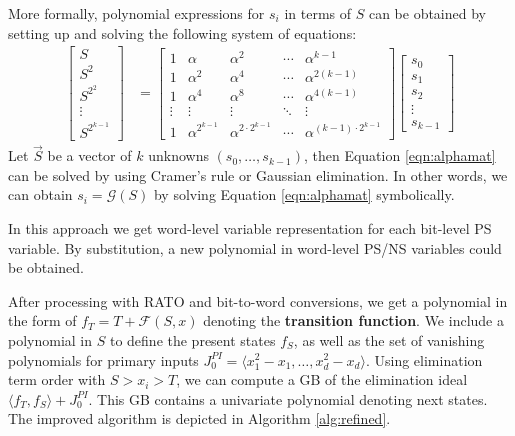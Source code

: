 More formally, polynomial expressions for $s_i$ in terms of $S$ can be
obtained by setting up and solving the following system of equations:
\begin{align}
\label{eqn:alphamat}
\begin{bmatrix}
S \\
S^2 \\
S^{2^2} \\
\vdots \\
S^{2^{k-1}}
\end{bmatrix}
&=
\begin{bmatrix}
1 & \alpha & \alpha^{2} & \cdots & \alpha^{{k-1}}\\
1 & \alpha^{2} & \alpha^{4} & \cdots & \alpha^{2(k-1)} \\
1 & \alpha^{4} & \alpha^{8} & \cdots & \alpha^{4(k-1)}\\
\vdots & \vdots & \vdots & \ddots & \vdots \\
1 & \alpha^{2^{k-1}} & \alpha^{2\cdot 2^{k-1}} & \cdots & \alpha^{(k-1)\cdot 2^{k-1}}
\end{bmatrix}
\begin{bmatrix}
s_0\\
s_1\\
s_2\\
\vdots\\
s_{k-1}
\end{bmatrix}
\end{align}
Let $\vec{S}$ be a vector of $k$ unknowns $(s_0,\dots,s_{k-1})$,
then Equation \ref{eqn:alphamat} can be solved by using Cramer's rule or Gaussian elimination.
In other words, we can obtain $s_i=\mathcal G(S)$ by solving Equation \ref{eqn:alphamat} symbolically.

In this approach we get word-level variable representation for each bit-level PS variable. 
By substitution, a new polynomial in word-level PS/NS variables could be obtained.

After processing with RATO and bit-to-word conversions, we get a polynomial in the 
form of $f_T = T+\mathcal{F}(S,x)$
denoting the {\bf transition function}. We include a polynomial in $S$ to define the present states $f_S$,
as well as the set of vanishing polynomials for primary inputs 
$J_0^{PI} = \langle x_1^2-x_1,\dots,x_d^2-x_d\rangle$. Using elimination term order with $S>x_i>T$,
we can compute a GB of the elimination ideal $\langle f_T,f_S\rangle + J_0^{PI}$. This GB contains a univariate
polynomial denoting next states. The improved algorithm is depicted in Algorithm \ref{alg:refined}.


